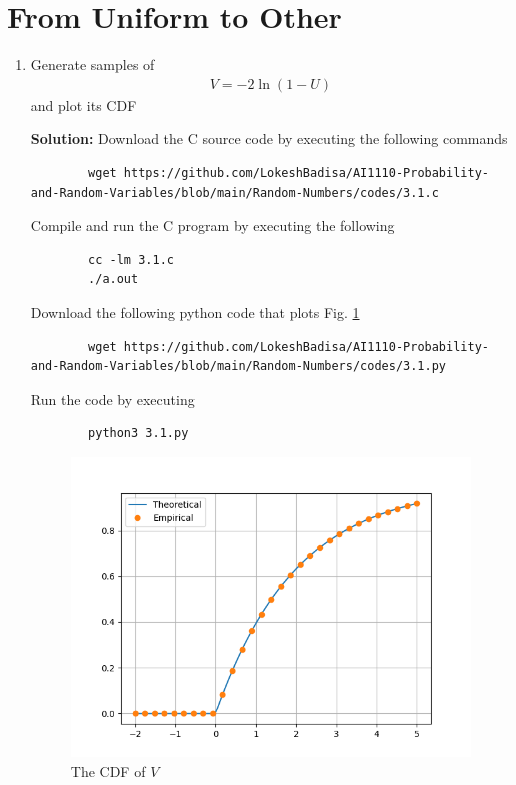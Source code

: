 \documentclass[journal,12pt,twocolumn]{IEEEtran}
\newcommand{\solution}{\noindent \textbf{Solution: }}
\providecommand{\brak}[1]{\ensuremath{\left(#1\right)}}
\numberwithin{equation}{section}
\renewcommand\thesection{\arabic{section}}
\begin{document}
	\section{From Uniform to Other}
	\begin{enumerate}[label=\thesection.\arabic*,ref=\thesection.\theenumi]
	\item Generate samples of 
	\begin{align}
		V = -2\ln\brak{1-U}
	\end{align}
	and plot its CDF
	
	\solution Download the C source code by executing the following commands
	\begin{lstlisting}
		wget https://github.com/LokeshBadisa/AI1110-Probability-and-Random-Variables/blob/main/Random-Numbers/codes/3.1.c
	\end{lstlisting}
	Compile and run the C program by executing the following
	\begin{lstlisting}
		cc -lm 3.1.c
		./a.out
	\end{lstlisting}
	Download the following python code that plots Fig. \ref{fig-3.1}
	\begin{lstlisting}
		wget https://github.com/LokeshBadisa/AI1110-Probability-and-Random-Variables/blob/main/Random-Numbers/codes/3.1.py
	\end{lstlisting}
	Run the code by executing
	\begin{lstlisting}
		python3 3.1.py
	\end{lstlisting}
	\begin{figure}
		\centering
		\includegraphics[width=\columnwidth]{./figs/3.1.png}
		\caption{The CDF of $V$}
		\label{fig-3.1}
	\end{figure}	
	

\end{enumerate}
\end{document}
